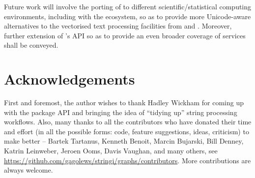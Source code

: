 \documentclass[nojss]{jss}
\begin{document}
\bigskip
Future work will involve the porting of  to different
scientific/statistical computing environments, including 
with the  \citep{numpy} ecosystem,
so as to provide more Unicode-aware
alternatives to the vectorised text processing
facilities from  and  \citep[Chap.~7]{pandas}.
Moreover, further extension of 's API
so as to  provide an even broader coverage of  services
shall be conveyed.






\section*{Acknowledgements}

First and foremost, the author wishes to thank Hadley Wickham for coming
up with the  package API and bringing the idea of ``tidying up''
 string processing workflows.
Also, many thanks to all the contributors who have donated their
time and effort (in all the possible forms: code, feature suggestions,
ideas, criticism) to make  better --
Bartek Tartanus,
Kenneth Benoit,
Marcin Bujarski,
Bill Denney,
Katrin Leinweber,
Jeroen Ooms,
Davis Vaughan,
and many others,
see \url{https://github.com/gagolews/stringi/graphs/contributors}.
More contributions are always welcome.





\end{document}
